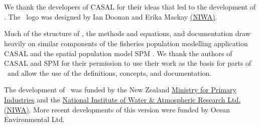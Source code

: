 \section{\label{sec:acknowledgements}}

We thank the developers of CASAL \citep{1388} for their ideas that led to the development of \CNAME. The \CNAME\ logo was designed by Ian Doonan and Erika Mackay \href{http://www.niwa.co.nz}{(NIWA)}.

Much of the structure of \CNAME, the methods and equations, and documentation draw heavily on similar components of the fisheries population modelling application CASAL \citep{1388} and  the spatial population model SPM \citep{SPM}. We thank the authors of CASAL and SPM for their permission to use their work as the basis for parts of \CNAME\ and allow the use of the definitions, concepts, and documentation.

The development of \CNAME\ was funded by the New Zealand \href{http://www.mpi.govt.nz}{Ministry for Primary Industries} and the \href{http://www.niwa.co.nz}{National Institute of Water \& Atmospheric Research Ltd. (NIWA)}. More recent developments of this version were funded by Ocean Environmental Ltd.
